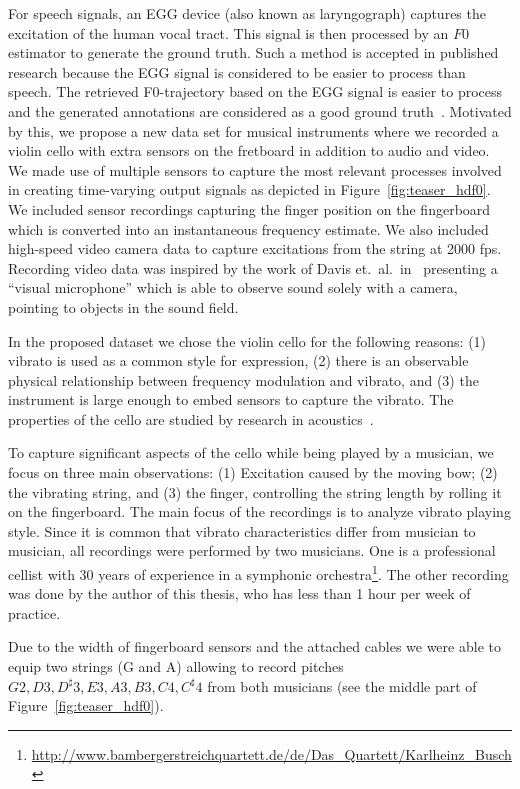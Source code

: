 For speech signals, an EGG device (also known as laryngograph) captures the excitation of the human vocal tract. 
This signal is then processed by an $F0$ estimator to generate the ground truth. 
Such a method is accepted in published research because the EGG signal is considered to be easier to process than speech. 
The retrieved F0-trajectory based on the EGG signal is easier to process and the generated annotations are considered as a good ground truth~\cite{pirker11, babacan13}.
Motivated by this, we propose a new data set for musical instruments where we recorded a violin cello with extra sensors on the fretboard in addition to audio and video.
We made use of multiple sensors to capture the most relevant processes involved in creating time-varying output signals as depicted in Figure~\ref{fig:teaser_hdf0}.
We included sensor recordings capturing the finger position on the fingerboard which is converted into an instantaneous frequency estimate.
We also included high-speed video camera data to capture excitations from the string at 2000 fps.
Recording video data was inspired by the work of Davis et.\ al.\ in~\cite{Davis2014VisualMic} presenting a ``visual microphone'' which is able to observe sound solely with a camera, pointing to objects in the sound field. 
\par
In the proposed dataset we chose the violin cello for the following reasons: (1) vibrato is used as a common style for expression, (2) there is an observable physical relationship between frequency modulation and vibrato, and (3) the instrument is large enough to embed sensors to capture the vibrato. The properties of the cello are studied by research in acoustics~\cite{woodhouse04, woodhouse99}.
\par
To capture significant aspects of the cello while being played by a musician, we focus on three main observations: (1) Excitation caused by the moving bow; (2) the vibrating string, and (3) the finger, controlling the string length by rolling it on the fingerboard.
The main focus of the recordings is to analyze vibrato playing style. Since it is common that vibrato characteristics differ from musician to musician, all recordings were performed by two musicians. One is a professional cellist with 30 years of experience in a symphonic orchestra\footnote{\url{http://www.bambergerstreichquartett.de/de/Das_Quartett/Karlheinz_Busch}}.
The other recording was done by the author of this thesis, who has less than 1 hour per week of practice.
\par
Due to the width of fingerboard sensors and the attached cables we were able to equip two strings (G and A) allowing to record pitches ${G2, D3, D^\sharp3, E3, A3, B3, C4, C^\sharp4}$ from both musicians (see the middle part of Figure~\ref{fig:teaser_hdf0}).
